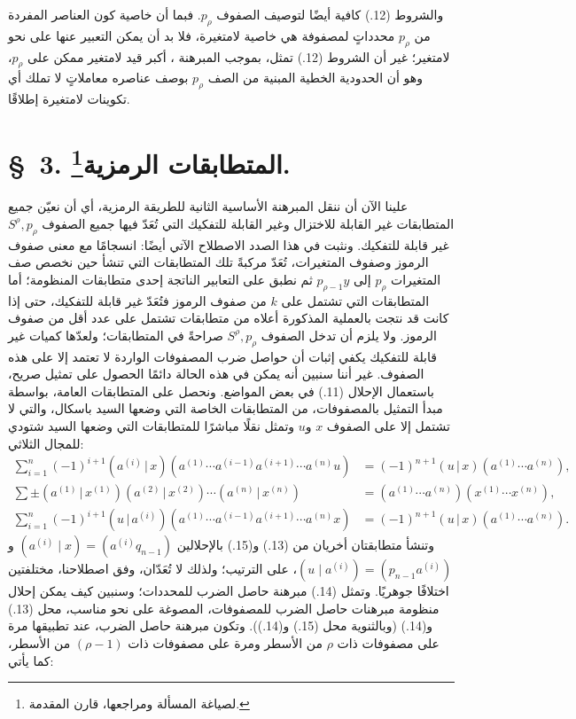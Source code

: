 \documentclass[11pt]{article}
\newcommand{\srcLTR}[1]{\relax\ifmmode\text{\mbox{\babelsublr{\foreignlanguage{english}{#1}}}}\else\babelsublr{\foreignlanguage{english}{#1}}\fi}
\providecommand{\pair}[2]{(#1\,|\,#2)}
\begin{document}
والشروط (12.) كافية أيضًا لتوصيف الصفوف $p_\rho$. فبما أن خاصية كون العناصر المفردة من $p_\rho$ محدداتٍ لمصفوفة هي خاصية لامتغيرة، فلا بد أن يمكن التعبير عنها على نحو لامتغير؛ غير أن الشروط (12.) تمثل، بموجب المبرهنة \srcLTR{VI}، أكبر قيد لامتغير ممكن على $p_\rho$، وهو أن الحدودية الخطية المبنية من الصف $p_\rho$ بوصف عناصره معاملاتٍ لا تملك أي تكوينات لامتغيرة إطلاقًا.

\section*{\S\ 3. المتطابقات الرمزية\footnote{لصياغة المسألة ومراجعها، قارن المقدمة.}.}
علينا الآن أن ننقل المبرهنة الأساسية الثانية للطريقة الرمزية، أي أن نعيّن جميع المتطابقات غير القابلة للاختزال وغير القابلة للتفكيك التي تُعَدّ فيها جميع الصفوف $S^\rho,p_\rho$ غير قابلة للتفكيك. ونثبت في هذا الصدد الاصطلاح الآتي أيضًا: انسجامًا مع معنى صفوف الرموز وصفوف المتغيرات، تُعَدّ مركبةً تلك المتطابقات التي تنشأ حين نخصص صف المتغيرات $p_\rho$ إلى $p_{\rho-1}y$ ثم نطبق على التعابير الناتجة إحدى متطابقات المنظومة؛ أما المتطابقات التي تشتمل على $k$ من صفوف الرموز فتُعَدّ غير قابلة للتفكيك، حتى إذا كانت قد نتجت بالعملية المذكورة أعلاه من متطابقات تشتمل على عدد أقل من صفوف الرموز. ولا يلزم أن تدخل الصفوف $S^\rho,p_\rho$ صراحةً في المتطابقات؛ ولعدّها كميات غير قابلة للتفكيك يكفي إثبات أن حواصل ضرب المصفوفات الواردة لا تعتمد إلا على هذه الصفوف. غير أننا سنبين أنه يمكن في هذه الحالة دائمًا الحصول على تمثيل صريح، باستعمال الإحلال (11.) في بعض المواضع. ونحصل على المتطابقات العامة، بواسطة مبدأ التمثيل بالمصفوفات، من المتطابقات الخاصة التي وضعها السيد باسكال، والتي لا تشتمل إلا على الصفوف $x$ و$u$ وتمثل نقلًا مباشرًا للمتطابقات التي وضعها السيد شتودي للمجال الثلاثي:
\begin{align}
\sum_{i=1}^n(-1)^{i+1}\pair{a^{(i)}}{x}(a^{(1)}\cdots a^{(i-1)}a^{(i+1)}\cdots a^{(n)}u)&=(-1)^{n+1}\pair{u}{x}(a^{(1)}\cdots a^{(n)}),\tag{13}\\
\sum\pm\pair{a^{(1)}}{x^{(1)}}\pair{a^{(2)}}{x^{(2)}}\cdots\pair{a^{(n)}}{x^{(n)}}&=(a^{(1)}\cdots a^{(n)})(x^{(1)}\cdots x^{(n)}),\tag{14}\\
\sum_{i=1}^n(-1)^{i+1}\pair{u}{a^{(i)}}(a^{(1)}\cdots a^{(i-1)}a^{(i+1)}\cdots a^{(n)}x)&=(-1)^{n+1}\pair{u}{x}(a^{(1)}\cdots a^{(n)}).\tag{15}
\end{align}
وتنشأ متطابقتان أخريان من (13.) و(15.) بالإحلالين $(a^{(i)}\mid x)=(a^{(i)}q_{n-1})$ و$(u\mid a^{(i)})=(p_{n-1}a^{(i)})$، على الترتيب؛ ولذلك لا تُعَدّان، وفق اصطلاحنا، مختلفتين اختلافًا جوهريًا. وتمثل (14.) مبرهنة حاصل الضرب للمحددات؛ وسنبين كيف يمكن إحلال منظومة مبرهنات حاصل الضرب للمصفوفات، المصوغة على نحو مناسب، محل (13.) و(14.) (وبالثنوية محل (15.) و(14.)). وتكون مبرهنة حاصل الضرب، عند تطبيقها مرة على مصفوفات ذات $\rho$ من الأسطر ومرة على مصفوفات ذات $(\rho-1)$ من الأسطر، كما يأتي:
\end{document}
